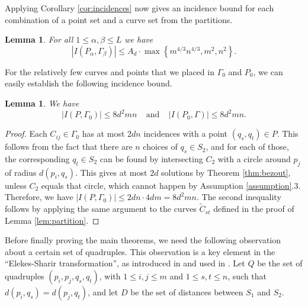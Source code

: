 \documentclass[12pt]{article}
\newtheorem{lemma}[theorem]{Lemma}
\begin{document}

Applying Corollary \ref{cor:incidences} now gives an incidence bound
for each combination of a point set and a curve set from the partitions.

\begin{lemma}\label{lem:mainincidences}
For all $1\leq \alpha,\beta\leq L$ we have
$$|I(P_\alpha,\Gamma_\beta)| \leq A_d\cdot \max\left\{m^{4/3}n^{4/3}, m^2, n^2\right\}.$$
\end{lemma}



For the relatively few curves and points that we placed in $\Gamma_0$ and $P_0$, we can easily establish the following incidence bound.

\begin{lemma}\label{lem:minorincidences}
 We have 
 $$|I(P,\Gamma_0)| \leq 8d^2mn~~~~~\text{and}~~~~~
 |I(P_0,\Gamma)| \leq 8d^2mn.$$
\end{lemma}
\begin{proof}
 Each $C_{ij}\in\Gamma_0$ has at most $2dn$ incidences with a point $(q_s,q_t)\in P$.
This follows from the fact that there are $n$ choices of $q_s\in S_2$, 
and for each of those, the corresponding $q_t\in S_2$ can be found 
by intersecting $C_2$ with a circle around $p_j$ of radius $d(p_i,q_s)$. 
This gives at most $2d$ solutions by Theorem \ref{thm:bezout}, 
unless $C_2$ equals that circle,
which cannot happen by Assumption \ref{assumption}.3.
Therefore, we have $|I(P,\Gamma_0)| \leq 2dn\cdot 4dm = 8d^2mn$.
The second inequality follows by applying the same argument to the curves $\widetilde{C}_{st}$ 
defined in the proof of Lemma \ref{lem:partition}.
\end{proof}


Before finally proving the main theorems,
 we need the following observation about a certain set of quadruples.
 This observation is a key element in the ``Elekes-Sharir transformation'',
 as introduced in \cite{elekes:incidences} and used in \cite{guth:distances,sharir:distances}.
 Let $Q$ be the set of quadruples $(p_i, p_j, q_s, q_t)$, with $1\leq i,j\leq m$ and $1\leq s,t \leq n$,
 such that $d(p_i,q_s) = d(p_j,q_t)$, 
 and let $D$ be the set of distances between $S_1$ and $S_2$.
 
 
\end{document}

